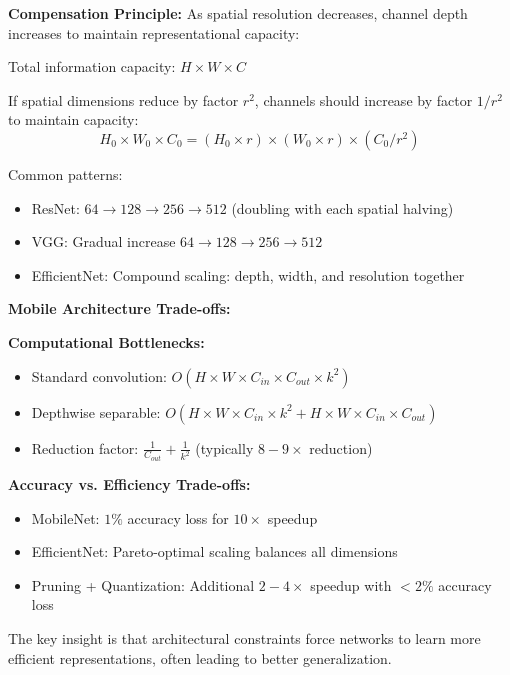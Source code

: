 \documentclass[12pt]{article}
\begin{document}
\begin{enumerate}[(a)]
{    \textbf{Compensation Principle:} As spatial resolution decreases, channel depth increases to maintain representational capacity:
    
    Total information capacity: $H \times W \times C$
    
    If spatial dimensions reduce by factor $r^2$, channels should increase by factor $1/r^2$ to maintain capacity:
    $$H_0 \times W_0 \times C_0 = (H_0 \times r) \times (W_0 \times r) \times (C_0/r^2)$$
    
    Common patterns:
    \begin{itemize}
        \item ResNet: $64 \rightarrow 128 \rightarrow 256 \rightarrow 512$ (doubling with each spatial halving)
        \item VGG: Gradual increase $64 \rightarrow 128 \rightarrow 256 \rightarrow 512$
        \item EfficientNet: Compound scaling: depth, width, and resolution together
    \end{itemize}
    
    \textbf{Mobile Architecture Trade-offs:}
    
    \textbf{Computational Bottlenecks:}
    \begin{itemize}
        \item Standard convolution: $O(H \times W \times C_{in} \times C_{out} \times k^2)$
        \item Depthwise separable: $O(H \times W \times C_{in} \times k^2 + H \times W \times C_{in} \times C_{out})$
        \item Reduction factor: $\frac{1}{C_{out}} + \frac{1}{k^2}$ (typically $8-9\times$ reduction)
    \end{itemize}
    
    \textbf{Accuracy vs. Efficiency Trade-offs:}
    \begin{itemize}
        \item MobileNet: $1\%$ accuracy loss for $10\times$ speedup
        \item EfficientNet: Pareto-optimal scaling balances all dimensions
        \item Pruning + Quantization: Additional $2-4\times$ speedup with $<2\%$ accuracy loss
    \end{itemize}
    
    The key insight is that architectural constraints force networks to learn more efficient representations, often leading to better generalization.
    }
\end{enumerate}
\end{document}
